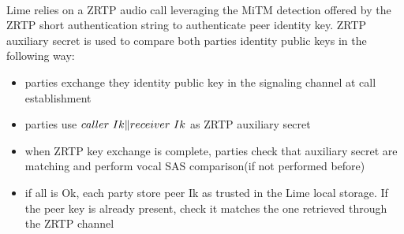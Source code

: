 \documentclass[a4paper,11pt]{article}
\begin{document}
    \paragraph{}Lime relies on a ZRTP\cite{zrtp} audio call leveraging the MiTM detection offered by the ZRTP short authentication string to authenticate peer identity key. ZRTP auxiliary secret is used to compare both parties identity public keys in the following way:
    \begin{itemize}
      \item parties exchange they identity public key in the signaling channel at call establishment
      \item parties use $caller\ Ik \Arrowvert receiver\ Ik$ as ZRTP auxiliary secret
      \item when ZRTP key exchange is complete, parties check that auxiliary secret are matching and perform vocal SAS comparison(if not performed before)
      \item if all is Ok, each party store peer Ik as trusted in the Lime local storage. If the peer key is already present, check it matches the one retrieved through the ZRTP channel  
    \end{itemize}
    
\end{document}
